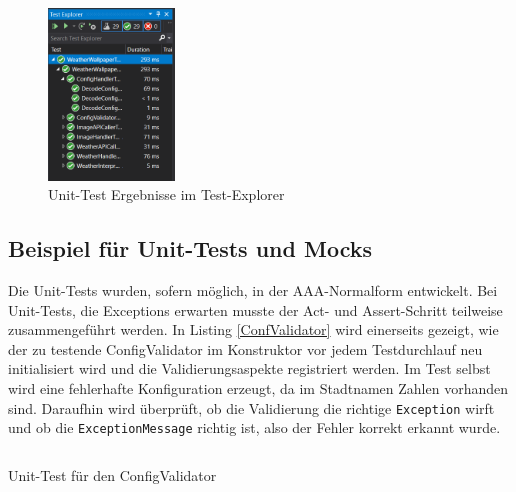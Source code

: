 \begin{figure}[ht]
\centering
\includegraphics[width=0.3\textwidth]{Bilder/TestExplorer}
\caption[Unit-Test Ergebnisse im Test-Explorer]{\label{TestExplorer} Unit-Test Ergebnisse im Test-Explorer}
\end{figure}
\subsection{Beispiel für Unit-Tests und Mocks}
Die Unit-Tests wurden, sofern möglich, in der AAA-Normalform entwickelt. Bei Unit-Tests, die Exceptions erwarten musste der Act- und Assert-Schritt teilweise zusammengeführt werden. In Listing \ref{ConfValidator} wird einerseits gezeigt, wie der zu testende ConfigValidator im Konstruktor vor jedem Testdurchlauf neu initialisiert wird und die Validierungsaspekte registriert werden. Im Test selbst wird eine fehlerhafte Konfiguration erzeugt, da im Stadtnamen Zahlen vorhanden sind. Daraufhin wird überprüft, ob die Validierung die richtige \texttt{Exception} wirft und ob die \texttt{ExceptionMessage} richtig ist, also der Fehler korrekt erkannt wurde.

\begin{listing}[h]
\inputminted[linenos=true,frame=lines]{csharp}{Listings/ConfigValidatorTest.cs}
\caption{Unit-Test für den ConfigValidator}
\label{ConfValidator}
\end{listing}


